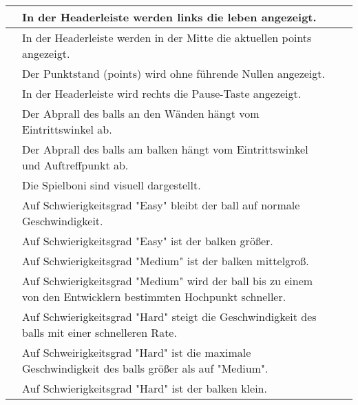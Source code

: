 \begin{xltabular}{\textwidth}{|l|X|r|r|}
      & In der Headerleiste werden links die \gls{leben} angezeigt.             &      &      \\ \hline
      & In der Headerleiste werden in der Mitte die aktuellen \glspl{point} angezeigt.             &      &      \\ \hline 
      & Der Punktstand (\glspl{point}) wird ohne führende Nullen angezeigt.             &      &      \\ \hline
      & In der Headerleiste wird rechts die Pause-Taste angezeigt.             &      &      \\ \hline
    
    \setSystem{\ref*{sys:cm}}   %

      & Der Abprall des \glspl{ball} an den Wänden hängt vom Eintrittswinkel ab.             &      &      \\ \hline
      & Der Abprall des \glspl{ball} am \gls{balken} hängt vom Eintrittswinkel und Auftreffpunkt ab.             &      &      \\ \hline
      & \OPT{*} Die Spielboni sind visuell dargestellt.        &      &      \\ \hline
      & Auf Schwierigkeitsgrad "Easy" bleibt der \gls{ball} auf normale Geschwindigkeit.              &      &      \\ \hline
      & Auf Schwierigkeitsgrad "Easy" ist der \gls{balken} größer.              &      &      \\ \hline
      & Auf Schwierigkeitsgrad "Medium" ist der \gls{balken} mittelgroß.            &      &      \\ \hline
      & Auf Schwierigkeitsgrad "Medium" wird der \gls{ball} bis zu einem von den Entwicklern bestimmten Hochpunkt schneller.             &      &      \\ \hline
      & Auf Schwierigkeitsgrad "Hard" steigt die Geschwindigkeit des \glspl{ball} mit einer schnelleren Rate.             &      &      \\ \hline
      & Auf Schweirigkeitsgrad "Hard" ist die maximale Geschwindigkeit des \glspl{ball} größer als auf "Medium".             &      &      \\ \hline
      & Auf Schwierigkeitsgrad "Hard" ist der \gls{balken} klein.             &      &      \\ \hline


\end{xltabular}
